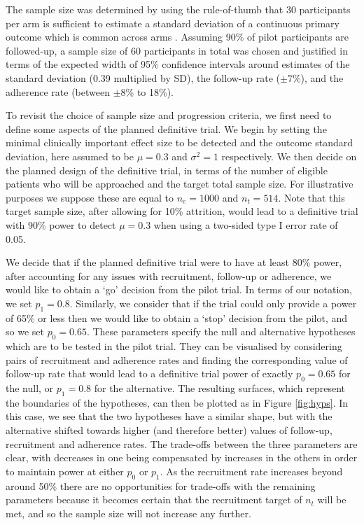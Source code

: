 \documentclass{article}
\begin{document}
The sample size was determined by using the rule-of-thumb that 30 participants per arm is sufficient to estimate a standard deviation of a continuous primary outcome which is common across arms \cite{Lancaster2004}. Assuming 90\% of pilot participants are followed-up, a sample size of 60 participants in total was chosen and justified in terms of the expected width of 95\% confidence intervals around estimates of the standard deviation (0.39 multiplied by SD), the follow-up rate ($\pm 7$\%), and the adherence rate (between $\pm 8$\% to 18\%).

To revisit the choice of sample size and progression criteria, we first need to define some aspects of the planned definitive trial. We begin by setting the minimal clinically important effect size to be detected and the outcome standard deviation, here assumed to be $\mu = 0.3$ and $\sigma^2 = 1$ respectively. We then decide on the planned design of the definitive trial, in terms of the number of eligible patients who will be approached and the target total sample size. For illustrative purposes we suppose these are equal to $n_e = 1000$ and $n_t = 514$. Note that this target sample size, after allowing for 10\% attrition, would lead to a definitive trial with 90\% power to detect $\mu=0.3$ when using a two-sided type I error rate of 0.05.

We decide that if the planned definitive trial were to have at least 80\% power, after accounting for any issues with recruitment, follow-up or adherence, we would like to obtain a `go' decision from the pilot trial. In terms of our notation, we set $p_1 = 0.8$. Similarly, we consider that if the trial could only provide a power of 65\% or less then we would like to obtain a `stop' decision from the pilot, and so we set $p_0 = 0.65$. These parameters specify the null and alternative hypotheses which are to be tested in the pilot trial. They can be visualised by considering pairs of recruitment and adherence rates and finding the corresponding value of follow-up rate that would lead to a definitive trial power of exactly $p_0 = 0.65$ for the null, or $p_1 = 0.8$ for the alternative. The resulting surfaces, which represent the boundaries of the hypotheses, can then be plotted as in Figure \ref{fig:hyps}. In this case, we see that the two hypotheses have a similar shape, but with the alternative shifted towards higher (and therefore better) values of follow-up, recruitment and adherence rates. The trade-offs between the three parameters are clear, with decreases in one being compensated by increases in the others in order to maintain power at either $p_0$ or $p_1$. As the recruitment rate increases beyond around 50\% there are no opportunities for trade-offs with the remaining parameters because it becomes certain that the recruitment target of $n_t$ will be met, and so the sample size will not increase any further.
\end{document}

